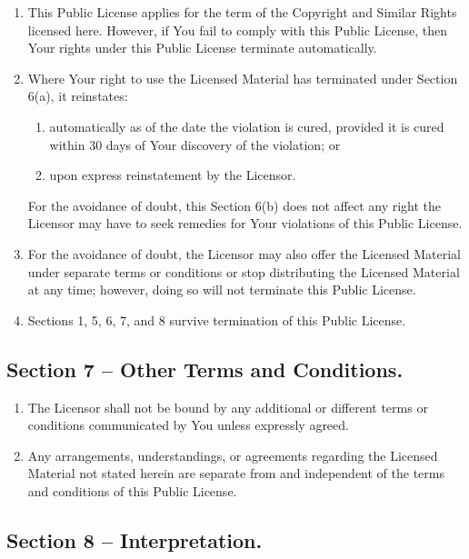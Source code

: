 \begin{enumerate}
\item
  This Public License applies for the term of the Copyright and Similar
  Rights licensed here.
  However, if You fail to comply with this Public
  License, then Your rights under this Public License terminate
  automatically.
\item
  Where Your right to use the Licensed Material has terminated under
  Section 6(a), it reinstates:
  \begin{enumerate}
  \item
    automatically as of the date the violation is cured, provided it is
    cured within 30 days of Your discovery of the violation;
    or
  \item
    upon express reinstatement by the Licensor.
  \end{enumerate}
  For the avoidance of doubt, this Section 6(b) does not affect any
  right the Licensor may have to seek remedies for Your violations of
  this Public License.
\item
  For the avoidance of doubt, the Licensor may also offer the Licensed
  Material under separate terms or conditions or stop distributing the
  Licensed Material at any time;
  however, doing so will not terminate
  this Public License.
\item
  Sections 1, 5, 6, 7, and 8 survive termination of this Public License.
\end{enumerate}

\subsection*{Section 7 -- Other Terms and Conditions.}

\begin{enumerate}
\item
  The Licensor shall not be bound by any additional or different terms
  or conditions communicated by You unless expressly agreed.
\item
  Any arrangements, understandings, or agreements regarding the Licensed
  Material not stated herein are separate from and independent of the
  terms and conditions of this Public License.
\end{enumerate}

\subsection*{Section 8 -- Interpretation.}

